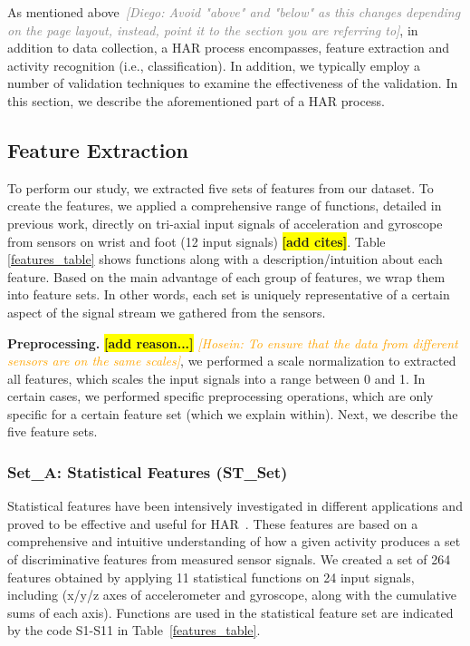 \documentclass[journal,article,submit,moreauthors,pdftex]{Definitions/mdpi}
\newcommand{\hosein}[1]{\textcolor{orange}{{\it [Hosein: #1]}}}
\newcommand{\diego}[1]{\textcolor{gray}{{\it [Diego: #1]}}}
\newcommand{\todo}[1]{\colorbox{yellow}{\textbf{[#1]}}}
\begin{document}
As mentioned above~\diego{Avoid "above" and "below" as this changes depending on the page layout, instead, point it to the section you are referring to}, in addition to data collection, a HAR process encompasses, feature extraction and activity recognition (i.e., classification). In addition, we typically employ a number of validation techniques to examine the effectiveness of the validation. In this section, we describe the aforementioned part of a HAR process.

\subsection{Feature Extraction}

To perform our study, we extracted five sets of features from our dataset. To create the features, we applied a comprehensive range of functions, detailed in previous work, directly on tri-axial input signals of acceleration and gyroscope from sensors on wrist and foot (12 input signals) \cite{morris2014recofit, yurtman2017activity, zhang2011feature, Sarbishei2019platform} \todo{add cites}. Table \ref{features_table} shows functions along with a description/intuition about each feature. Based on the main advantage of each group of features, we wrap them into  feature sets. In other words, each set is uniquely representative of a certain aspect of the signal stream we gathered from the sensors. 

\textbf{Preprocessing.}  \todo{add reason...} \hosein{To ensure that the data from different sensors are on the same scales}, we performed a scale normalization to extracted all features, which scales the input signals into a range between 0 and 1. In certain cases, we performed specific preprocessing operations, which are only specific for a certain feature set (which we explain within). Next, we describe the five feature sets.

\subsubsection{Set\_A: Statistical Features (ST\_Set)}
Statistical features have been intensively investigated in different applications and proved to be effective and useful for HAR~\cite{rosati2018comparison}. These features are based on a comprehensive and intuitive understanding of how a given activity produces a set of discriminative features from measured sensor signals. We created a set of 264 features obtained by applying 11 statistical functions on 24 input signals, including (x/y/z axes of accelerometer and gyroscope, along with the cumulative sums of each axis). Functions are used in the statistical feature set are indicated by the code S1-S11 in Table~\ref{features_table}. 
\end{document}
